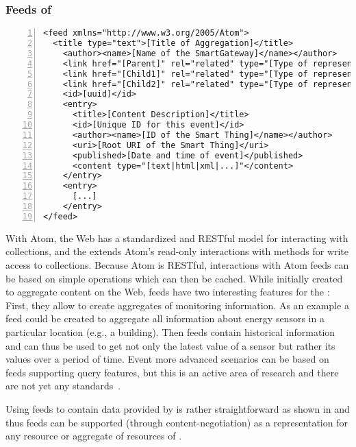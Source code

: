 \subsubsection{Feeds of \sts{}}
\begin{lstlisting}[caption=Example of usage of the Atom format for providing historical information about a \st{}., label=lst:feedSmartThing, breaklines, numbers=left, numberstyle=\tiny, xleftmargin=0.8cm, basicstyle=\small\ttfamily, backgroundcolor=\color{gray}, captionpos=b]
<feed xmlns="http://www.w3.org/2005/Atom">
  <title type="text">[Title of Aggregation]</title>
    <author><name>[Name of the SmartGateway]</name></author>
    <link href="[Parent]" rel="related" type="[Type of representation]"/>
    <link href="[Child1]" rel="related" type="[Type of representation]"/>
    <link href="[Child2]" rel="related" type="[Type of representation]"/>
    <id>[uuid]</id>
    <entry>
      <title>[Content Description]</title>
      <id>[Unique ID for this event]</id>
      <author><name>[ID of the Smart Thing]</name></author>
      <uri>[Root URI of the Smart Thing]</uri>
      <published>[Date and time of event]</published>
      <content type="[text|html|xml|...]"</content>
    </entry>
    <entry>
      [...]		
    </entry>
</feed>
\end{lstlisting}

With Atom, the Web has a standardized and RESTful model for interacting with collections, and the  extends Atom's read-only interactions with methods for write access to collections. Because Atom is RESTful, interactions with Atom feeds can be based on simple  operations which can then be cached.
While initially created to aggregate content on the Web, feeds have two interesting features for the \WoT{}: First, they allow to create aggregates of \sts{} monitoring information. As an example a feed could be created to aggregate all information about energy sensors in a particular location (e.g., a building). Then feeds contain historical information and can thus be used to get not only the latest value of a sensor but rather its values over a period of time. Event more advanced scenarios can be based on feeds supporting query features, but this is an active area of research and there are not yet any standards~\cite{Wilde2009}. 

Using feeds to contain data provided by \sts{} is rather straightforward as shown in  and thus feeds can be supported (through content-negotiation) as a representation for any resource or aggregate of resources of \sts{}.

